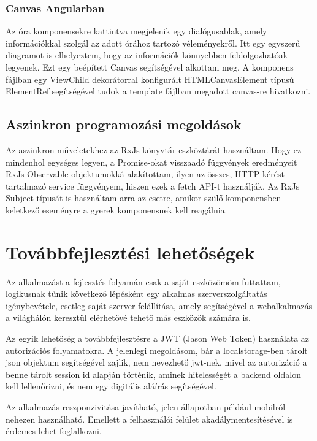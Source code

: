 \documentclass[a4paper,12pt]{report}
\theoremstyle{definition}
\theoremstyle{remark}
\begin{document}
	\subsection{Canvas Angularban}

Az óra komponensekre kattintva megjelenik egy dialógusablak, amely információkkal szolgál az adott órához tartozó véleményekről. Itt egy egyszerű diagramot is elhelyeztem, hogy az információk könnyebben feldolgozhatóak legyenek. Ezt egy beépített Canvas segítségével alkottam meg. A komponens fájlban egy ViewChild dekorátorral konfigurált HTMLCanvasElement típusú ElementRef segítségével tudok a template fájlban megadott canvas-re hivatkozni.

\section{Aszinkron programozási megoldások}

Az aszinkron műveletekhez az RxJs könyvtár eszköztárát használtam. Hogy ez mindenhol egységes legyen, a Promise-okat visszaadó függvények eredményeit RxJs Observable objektumokká alakítottam, ilyen az összes, HTTP kérést tartalmazó service függvényem, hiszen ezek a fetch API-t használják. Az RxJs Subject típusát is használtam arra az esetre, amikor szülő komponensben keletkező eseményre a gyerek komponensnek kell reagálnia.
 
\chapter{Továbbfejlesztési lehetőségek}

Az alkalmazást a fejlesztés folyamán csak a saját eszközömöm futtattam, logikusnak tűnik következő lépésként egy alkalmas szerverszolgáltatás igénybevétele, esetleg saját szerver felállítása, amely segítségével a webalkalmazás a világhálón keresztül elérhetővé tehető más eszközök számára is.

Az egyik lehetőség a továbbfejlesztésre a JWT\cite{JWTwebsite} (Jason Web Token) használata az autorizációs folyamatokra. A jelenlegi megoldásom, bár a localstorage-ben tárolt json objektum segítségével zajlik, nem nevezhető jwt-nek, mivel az autorizáció a benne tárolt session id alapján történik, aminek hitelességét a backend oldalon kell lellenőrizni, és nem egy digitális aláírás segítségével.

Az alkalmazás reszponzivitása javítható, jelen állapotban például mobilról nehezen használható. Emellett a felhasználói felület akadálymentesítésével is érdemes lehet foglalkozni.
\end{document}

